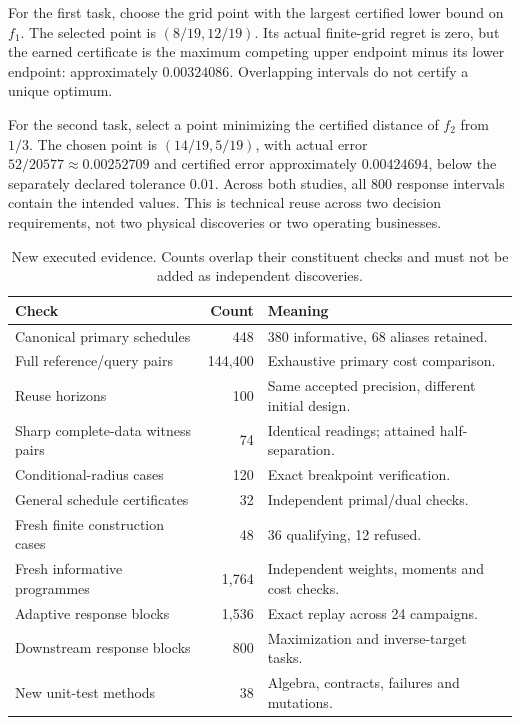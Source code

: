 \documentclass[11pt,letterpaper]{article}
\theoremstyle{definition}\newtheorem{definition}[theorem]{Definition}
\theoremstyle{remark}\newtheorem{remark}[theorem]{Remark}
\begin{document}
For the first task, choose the grid point with the largest certified lower bound on $f_1$. The selected point is $(8/19,12/19)$. Its actual finite-grid regret is zero, but the earned certificate is the maximum competing upper endpoint minus its lower endpoint: approximately $0.00324086$. Overlapping intervals do not certify a unique optimum.

For the second task, select a point minimizing the certified distance of $f_2$ from $1/3$. The chosen point is $(14/19,5/19)$, with actual error $52/20577\approx0.00252709$ and certified error approximately $0.00424694$, below the separately declared tolerance $0.01$. Across both studies, all 800 response intervals contain the intended values. This is technical reuse across two decision requirements, not two physical discoveries or two operating businesses.

\begin{table}[htbp]\centering\small
\caption{New executed evidence. Counts overlap their constituent checks and must not be added as independent discoveries.}
\begin{tabularx}{\linewidth}{@{}YrY@{}}\toprule
Check & Count & Meaning\\\midrule
Canonical primary schedules & 448 & 380 informative, 68 aliases retained.\\
Full reference/query pairs & 144,400 & Exhaustive primary cost comparison.\\
Reuse horizons & 100 & Same accepted precision, different initial design.\\
Sharp complete-data witness pairs & 74 & Identical readings; attained half-separation.\\
Conditional-radius cases & 120 & Exact breakpoint verification.\\
General schedule certificates & 32 & Independent primal/dual checks.\\
Fresh finite construction cases & 48 & 36 qualifying, 12 refused.\\
Fresh informative programmes & 1,764 & Independent weights, moments and cost checks.\\
Adaptive response blocks & 1,536 & Exact replay across 24 campaigns.\\
Downstream response blocks & 800 & Maximization and inverse-target tasks.\\
New unit-test methods & 38 & Algebra, contracts, failures and mutations.\\\bottomrule
\end{tabularx}
\label{tab:evidence}
\end{table}
\end{document}
